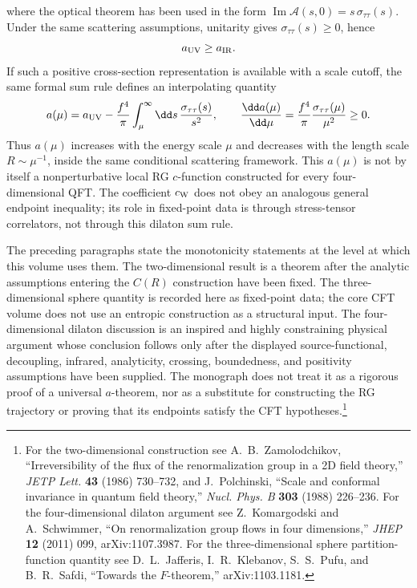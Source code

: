 where the optical theorem has been used in the form
\(\operatorname{Im}\mathcal A(s,0)=s\,\sigma_{\tau\tau}(s)\).  Under the same
scattering assumptions, unitarity gives \(\sigma_{\tau\tau}(s)\geq0\), hence
\[
  a_{\rm UV}\geq a_{\rm IR}.
\]
If such a positive cross-section representation is available with a scale
cutoff, the same formal sum rule defines an interpolating quantity
\begin{equation}
  a(\mu)
  =
  a_{\rm UV}
  -
  \frac{f^4}{\pi}
  \int_\mu^\infty\dd s\,
  \frac{\sigma_{\tau\tau}(s)}{s^2},
  \qquad
  \frac{\dd a(\mu)}{\dd\mu}
  =
  \frac{f^4}{\pi}
  \frac{\sigma_{\tau\tau}(\mu)}{\mu^2}
  \geq0 .
  \label{eq:ks-interpolating-a}
\end{equation}
Thus \(a(\mu)\) increases with the energy scale \(\mu\) and decreases with
the length scale \(R\sim\mu^{-1}\), inside the same conditional scattering
framework.  This \(a(\mu)\) is not by itself a nonperturbative local RG
\(c\)-function constructed for every four-dimensional QFT.  The coefficient
\(c_{\rm W}\) does not obey an analogous general endpoint inequality; its role
in fixed-point data is through stress-tensor correlators, not through this
dilaton sum rule.

\begin{remark}
The preceding paragraphs state the monotonicity statements at the level at
which this volume uses them.  The two-dimensional result is a theorem after
the analytic assumptions entering the \(C(R)\) construction have been fixed.
The three-dimensional sphere quantity is recorded here as fixed-point data;
the core CFT volume does not use an entropic construction as a structural
input.  The four-dimensional dilaton discussion is an inspired and highly
constraining physical argument whose conclusion follows only after the
displayed source-functional, decoupling, infrared, analyticity, crossing,
boundedness, and positivity assumptions have been supplied.  The monograph
does not treat it as a rigorous proof of a universal \(a\)-theorem, nor as a
substitute for constructing the RG trajectory or proving that its endpoints
satisfy the CFT hypotheses.\footnote{For the two-dimensional construction see
A.~B.~Zamolodchikov, ``Irreversibility of the flux of the renormalization
group in a 2D field theory,'' \emph{JETP Lett.} \textbf{43} (1986) 730--732,
and J.~Polchinski, ``Scale and conformal invariance in quantum field
theory,'' \emph{Nucl. Phys. B} \textbf{303} (1988) 226--236.  For the
four-dimensional dilaton argument see Z.~Komargodski and A.~Schwimmer,
``On renormalization group flows in four dimensions,'' \emph{JHEP}
\textbf{12} (2011) 099, arXiv:1107.3987.  For the three-dimensional sphere
partition-function quantity see D.~L.~Jafferis, I.~R.~Klebanov,
S.~S.~Pufu, and B.~R.~Safdi, ``Towards the \(F\)-theorem,'' arXiv:1103.1181.}
\end{remark}

